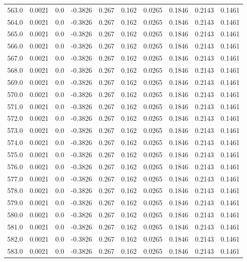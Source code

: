 \begin{longtable}{lrrrrrrrrr}
563.0 & 0.0021 & 0.0 & -0.3826 & 0.267 & 0.162 & 0.0265 & 0.1846 & 0.2143 & 0.1461 \\
564.0 & 0.0021 & 0.0 & -0.3826 & 0.267 & 0.162 & 0.0265 & 0.1846 & 0.2143 & 0.1461 \\
565.0 & 0.0021 & 0.0 & -0.3826 & 0.267 & 0.162 & 0.0265 & 0.1846 & 0.2143 & 0.1461 \\
566.0 & 0.0021 & 0.0 & -0.3826 & 0.267 & 0.162 & 0.0265 & 0.1846 & 0.2143 & 0.1461 \\
567.0 & 0.0021 & 0.0 & -0.3826 & 0.267 & 0.162 & 0.0265 & 0.1846 & 0.2143 & 0.1461 \\
568.0 & 0.0021 & 0.0 & -0.3826 & 0.267 & 0.162 & 0.0265 & 0.1846 & 0.2143 & 0.1461 \\
569.0 & 0.0021 & 0.0 & -0.3826 & 0.267 & 0.162 & 0.0265 & 0.1846 & 0.2143 & 0.1461 \\
570.0 & 0.0021 & 0.0 & -0.3826 & 0.267 & 0.162 & 0.0265 & 0.1846 & 0.2143 & 0.1461 \\
571.0 & 0.0021 & 0.0 & -0.3826 & 0.267 & 0.162 & 0.0265 & 0.1846 & 0.2143 & 0.1461 \\
572.0 & 0.0021 & 0.0 & -0.3826 & 0.267 & 0.162 & 0.0265 & 0.1846 & 0.2143 & 0.1461 \\
573.0 & 0.0021 & 0.0 & -0.3826 & 0.267 & 0.162 & 0.0265 & 0.1846 & 0.2143 & 0.1461 \\
574.0 & 0.0021 & 0.0 & -0.3826 & 0.267 & 0.162 & 0.0265 & 0.1846 & 0.2143 & 0.1461 \\
575.0 & 0.0021 & 0.0 & -0.3826 & 0.267 & 0.162 & 0.0265 & 0.1846 & 0.2143 & 0.1461 \\
576.0 & 0.0021 & 0.0 & -0.3826 & 0.267 & 0.162 & 0.0265 & 0.1846 & 0.2143 & 0.1461 \\
577.0 & 0.0021 & 0.0 & -0.3826 & 0.267 & 0.162 & 0.0265 & 0.1846 & 0.2143 & 0.1461 \\
578.0 & 0.0021 & 0.0 & -0.3826 & 0.267 & 0.162 & 0.0265 & 0.1846 & 0.2143 & 0.1461 \\
579.0 & 0.0021 & 0.0 & -0.3826 & 0.267 & 0.162 & 0.0265 & 0.1846 & 0.2143 & 0.1461 \\
580.0 & 0.0021 & 0.0 & -0.3826 & 0.267 & 0.162 & 0.0265 & 0.1846 & 0.2143 & 0.1461 \\
581.0 & 0.0021 & 0.0 & -0.3826 & 0.267 & 0.162 & 0.0265 & 0.1846 & 0.2143 & 0.1461 \\
582.0 & 0.0021 & 0.0 & -0.3826 & 0.267 & 0.162 & 0.0265 & 0.1846 & 0.2143 & 0.1461 \\
583.0 & 0.0021 & 0.0 & -0.3826 & 0.267 & 0.162 & 0.0265 & 0.1846 & 0.2143 & 0.1461 \\

\end{longtable}

